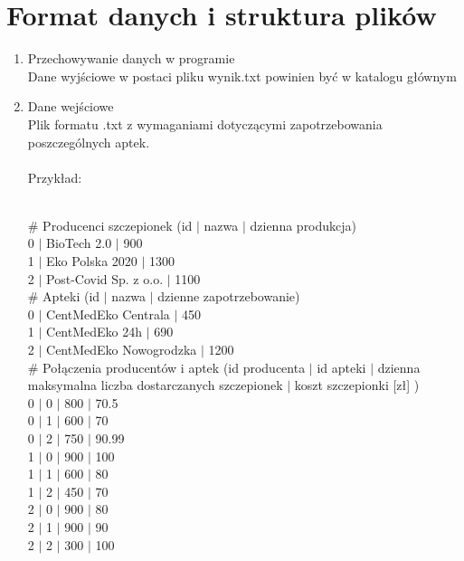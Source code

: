 \documentclass{article}
\begin{document}
\section{Format danych i struktura plików}
\begin{enumerate}
    \item Przechowywanie danych w programie
    \\Dane wyjściowe w postaci pliku wynik.txt powinien być w katalogu głównym
    \item Dane wejściowe
    \\Plik formatu .txt z wymaganiami dotyczącymi zapotrzebowania poszczególnych aptek.
    \\
    \\Przykład:
    \begin{tcolorbox}
    \\\# Producenci szczepionek (id $|$ nazwa $|$ dzienna produkcja)
    \\0 $|$ BioTech 2.0 $|$ 900
    \\1 $|$ Eko Polska 2020 $|$ 1300
    \\2 $|$ Post-Covid Sp. z o.o. $|$ 1100
    \\# Apteki (id $|$ nazwa $|$ dzienne zapotrzebowanie)
    \\0 $|$ CentMedEko Centrala $|$ 450
    \\1 $|$ CentMedEko 24h $|$ 690
    \\2 $|$ CentMedEko Nowogrodzka $|$ 1200
    \\\# Połączenia producentów i aptek (id producenta $|$ id apteki $|$ dzienna maksymalna liczba dostarczanych szczepionek $|$ koszt szczepionki [zł] )
    \\0 $|$ 0 $|$ 800 $|$ 70.5
    \\0 $|$ 1 $|$ 600 $|$ 70
    \\0 $|$ 2 $|$ 750 $|$ 90.99
    \\1 $|$ 0 $|$ 900 $|$ 100
    \\1 $|$ 1 $|$ 600 $|$ 80
    \\1 $|$ 2 $|$ 450 $|$ 70
    \\2 $|$ 0 $|$ 900 $|$ 80
    \\2 $|$ 1 $|$ 900 $|$ 90
    \\2 $|$ 2 $|$ 300 $|$ 100
    \end{tcolorbox}
    

\end{enumerate}
\end{document}
